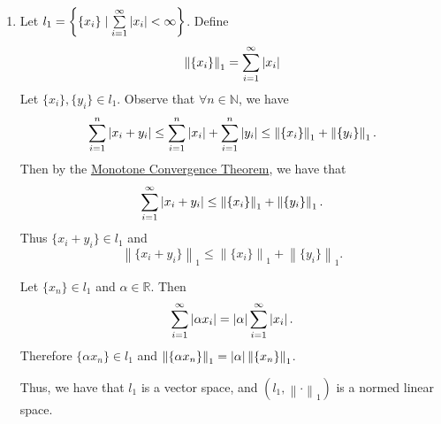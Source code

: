 \documentclass[notoc,notitlepage]{tufte-book}
\newcommand{\norm}[1]{\left\| #1 \right\|}
\begin{document}
\begin{eg}\label{eg:sequence_spaces}
  \begin{enumerate}
    \item Let $l_1 = \left\{ \{ x_i \} \mid \sum\limits_{i=1}^{\infty} \left|x_i\right| < \infty \right\}$. Define
      \begin{equation*}
        \norm{ \{ x_i \} }_1 = \sum_{i=1}^{\infty} \abs{x_i}
      \end{equation*}
      Let $\{ x_i \}, \{ y_i \} \in l_1$. Observe that $\forall n \in \mathbb{N}$, we have
      \begin{equation*}
        \sum_{i=1}^{n} \abs{x_i + y_i} \leq \sum_{i=1}^{n} \abs{x_i} + \sum_{i=1}^{n} \abs{y_i} \leq \norm{ \{ x_i \} }_1 + \norm{ \{ y_i \} }_1.
      \end{equation*}
      Then by the \hyperref[thm:monotone_convergence_theorem]{Monotone Convergence Theorem}, we have that
      \begin{equation*}
        \sum_{i=1}^{\infty} \abs{x_i + y_i} \leq \norm{ \{ x_i \} }_1 + \norm{ \{ y_i \} }_1.
      \end{equation*}
      Thus $\{ x_i + y_i \} \in l_1$ and
      \begin{equation*}
        \norm{ \{ x_i + y_i \} }_1 \leq \norm{ \{ x_i \} }_1 + \norm{ \{ y_i \} }_1.
      \end{equation*}

      Let $\{ x_n \} \in l_1$ and $\alpha \in \mathbb{R}$. Then
      \begin{equation*}
        \sum_{i=1}^{\infty} \left| \alpha x_i \right| = \left|\alpha\right| \sum_{i=1}^{\infty} \left|x_i\right|.
      \end{equation*}
      Therefore $\{ \alpha x_n \} \in l_1$ and $\norm{ \{ \alpha x_n \} }_1 = \abs{\alpha} \norm{ \{ x_n \} }_1$.

      Thus, we have that $l_1$ is a vector space, and $(l_1, \norm\cdot_1)$ is a normed linear space.


\end{enumerate}
\end{eg}
\end{document}
